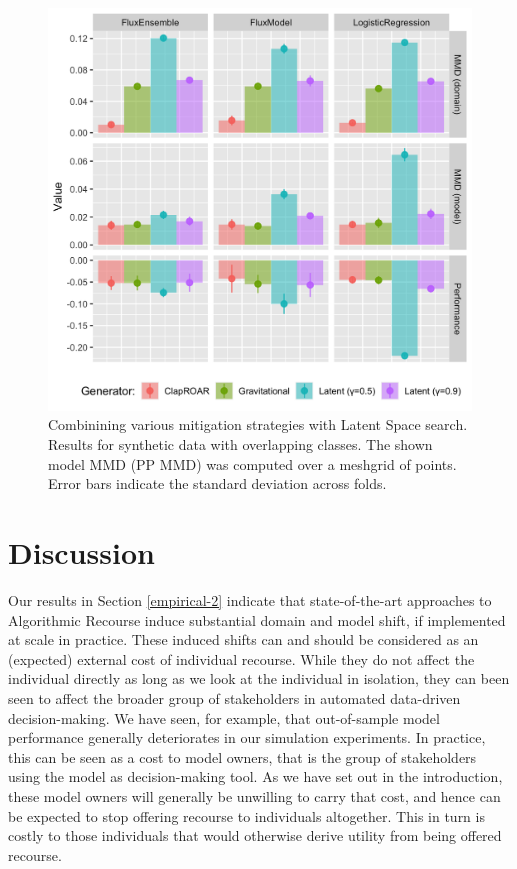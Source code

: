 \documentclass[conference,final,]{IEEEtran}
\begin{document}
\begin{figure}

{\centering \includegraphics[width=0.9\linewidth]{www/mitigation_synthetic_latent_results} 

}

\caption{Combinining various mitigation strategies with Latent Space search. Results for synthetic data with overlapping classes. The shown model MMD (PP MMD) was computed over a meshgrid of points. Error bars indicate the standard deviation across folds.}\label{fig:mitigate-latent-results}
\end{figure}

\hypertarget{discussion}{%
\section{Discussion}\label{discussion}}

Our results in Section \ref{empirical-2} indicate that state-of-the-art approaches to Algorithmic Recourse induce substantial domain and model shift, if implemented at scale in practice. These induced shifts can and should be considered as an (expected) external cost of individual recourse. While they do not affect the individual directly as long as we look at the individual in isolation, they can been seen to affect the broader group of stakeholders in automated data-driven decision-making. We have seen, for example, that out-of-sample model performance generally deteriorates in our simulation experiments. In practice, this can be seen as a cost to model owners, that is the group of stakeholders using the model as decision-making tool. As we have set out in the introduction, these model owners will generally be unwilling to carry that cost, and hence can be expected to stop offering recourse to individuals altogether. This in turn is costly to those individuals that would otherwise derive utility from being offered recourse.
\end{document}
